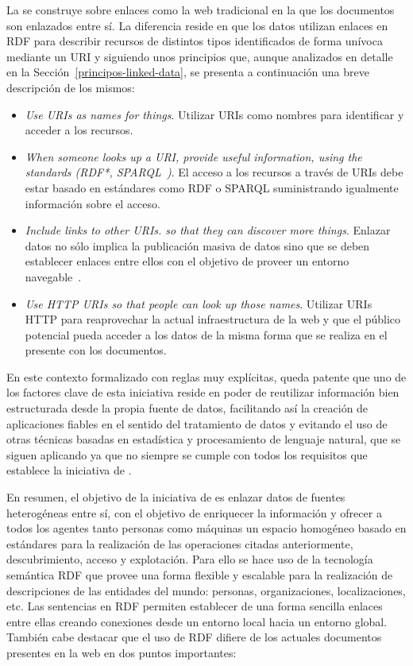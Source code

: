 La \wode se construye sobre enlaces como la web tradicional en la que los documentos son enlazados entre sí. La diferencia
reside en que los datos utilizan enlaces en \gls{RDF} para describir recursos de distintos tipos identificados de forma unívoca
mediante un \gls{URI} y siguiendo unos principios que, aunque analizados en detalle en la Sección~\ref{principos-linked-data}, se presenta a continuación una breve descripción de los mismos:
\begin{itemize}
 \item \textit{Use URIs as names for things}. Utilizar URIs como nombres para identificar y acceder a los recursos.
 \item \textit{When someone looks up a URI, provide useful information, using the standards (RDF*, \gls{SPARQL}~\cite{Sparql})}. El acceso 
a los recursos a través de URIs debe estar basado en estándares como RDF o SPARQL suministrando igualmente información
sobre el acceso.
\item \textit{Include links to other URIs. so that they can discover more things}. Enlazar datos no sólo implica la publicación
masiva de datos sino que se deben establecer enlaces entre ellos con el objetivo de proveer un entorno navegable~\cite{Berners-lee06tabulator:exploring,Pietriga06fresnel}.
\item \textit{Use \gls{HTTP URI}s so that people can look up those names}. Utilizar URIs HTTP para reaprovechar la actual infraestructura
de la web y que el público potencial pueda acceder a los datos de la misma forma que se realiza en el presente con los documentos.
\end{itemize}

En este contexto formalizado con reglas muy explícitas, queda patente 
que uno de los factores clave de esta iniciativa reside en poder de reutilizar información bien 
estructurada desde la propia fuente de datos, facilitando así la creación de aplicaciones fiables en el 
sentido del tratamiento de datos y evitando el uso de otras técnicas basadas en estadística y procesamiento
de lenguaje natural, que se siguen aplicando ya que no siempre se cumple con todos los requisitos que establece la iniciativa de \linkeddata.

En resumen, el objetivo de la iniciativa de \linkeddata es enlazar datos de fuentes heterogéneas entre sí, 
con el objetivo de enriquecer la información y ofrecer a todos los agentes tanto personas como máquinas
un espacio homogéneo basado en estándares para la realización de las operaciones citadas anteriormente, descubrimiento, acceso y explotación. 
Para ello se hace uso de la tecnología semántica \gls{RDF} que provee una forma flexible y escalable para la realización de descripciones de las entidades 
del mundo: personas, organizaciones, localizaciones, etc. Las sentencias en RDF permiten
establecer de una forma sencilla enlaces entre ellas creando conexiones desde un entorno local
hacia un entorno global. También cabe destacar que el uso de RDF difiere de los actuales
documentos presentes en la web en dos puntos importantes:

